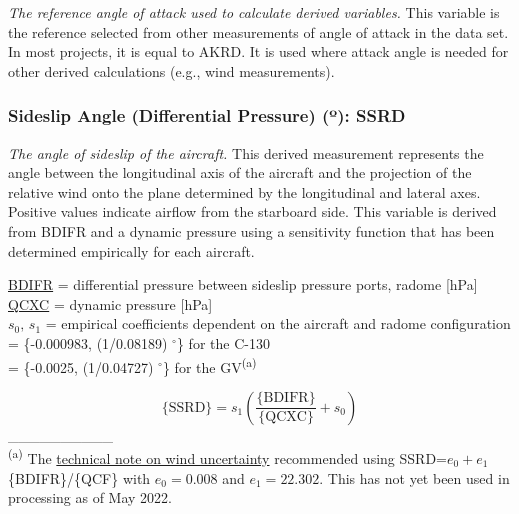 \documentclass[
]{book}
\begin{document}
\emph{The reference angle of attack used to calculate derived variables.} This variable is the reference selected from other measurements of angle of attack in the data set. In most projects, it is equal to AKRD. It is used where attack angle is needed for other derived calculations (e.g., wind measurements).

\hypertarget{ssrd}{%
\subsubsection*{\texorpdfstring{Sideslip Angle (Differential Pressure) ({º}): SSRD}{Sideslip Angle (Differential Pressure) (º): SSRD}}\label{ssrd}}

\emph{The angle of sideslip of the aircraft.} This derived measurement represents the angle between the longitudinal axis of the aircraft and the projection of the relative wind onto the plane determined by the longitudinal and lateral axes. Positive values indicate airflow from the starboard side. This variable is derived from BDIFR and a dynamic pressure using a sensitivity function that has been determined empirically for each aircraft.

\protect\hyperlink{bdifr}{BDIFR} = differential pressure between sideslip pressure ports, radome
{[}hPa{]}\\
\protect\hyperlink{qcx}{QCXC} = dynamic pressure {[}hPa{]}\\
\(s_{0},\,s{}_{1}\) = empirical
coefficients dependent on the aircraft and radome configuration\\
\hspace*{0.333em}\hspace*{0.333em}\hspace*{0.333em}\hspace*{0.333em}\hspace*{0.333em} = \{-0.000983, (1/0.08189) \(^\circ\)\} for the
C-130\\
\hspace*{0.333em}\hspace*{0.333em}\hspace*{0.333em}\hspace*{0.333em}\hspace*{0.333em} = \{-0.0025, (1/0.04727) \(^\circ\)\} for the GV\textsuperscript{(a)}

\begin{equation}
\mathrm{\{SSRD\}} = s_{1}(\frac{\mathrm{\{BDIFR\}}}{\{\mathrm{QCXC}\}}+s_{0})
\label{eq:SSRD}
\end{equation}
\_\_\_\_\_\_\_\_\_\_\\
\textsuperscript{(a)} The \href{http://dx.doi.org/10.5065/D60G3HJ8}{technical note on wind uncertainty}
recommended using SSRD=\(e_{0}+e_{1}\)\{BDIFR\}/\{QCF\} with \(e_{0}=0.008\)
and \(e_{1}=22.302\). This has not yet been used in processing as of
May 2022.
\end{document}
